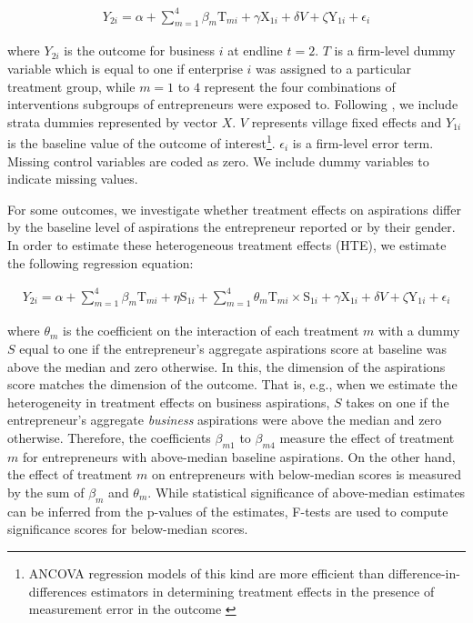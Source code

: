 \documentclass[11.5pt]{article}
\begin{document}
\begin{align}
    {Y}_{2i} = \alpha + \sum\limits_{m=1}^4 \beta_m \text{T}_{mi} + \gamma \text{X}_{1i} + \delta {V} + \zeta \text{Y}_{1i} + \epsilon_i \label{eq:1}
\end{align}

where ${Y}_{2i}$ is the outcome for business $i$ at endline $t=2$. $T$ is a firm-level dummy variable which is equal to one if enterprise $i$ was assigned to a particular treatment group, while $m = 1$ to $4$ represent the four combinations of interventions subgroups of entrepreneurs were exposed to. Following \citet{Bruhn2009}, we include strata dummies represented by vector $X$. $V$ represents village fixed effects and $Y_{1i}$ is the baseline value of the outcome of interest\footnote{ANCOVA regression models of this kind are more efficient than difference-in-differences estimators in determining treatment effects in the presence of measurement error in the outcome \citep{McKenzie2012}}. $\epsilon_i$ is a firm-level error term. Missing control variables are coded as zero. We include dummy variables to indicate missing values.

For some outcomes, we investigate whether treatment effects on aspirations differ by the baseline level of aspirations the entrepreneur reported or by their gender. In order to estimate these heterogeneous treatment effects (HTE), we estimate the following regression equation:

\begin{align}
    {Y}_{2i} = \alpha + \sum\limits_{m=1}^4 \beta_m \text{T}_{mi} + \eta \text{S}_{1i} + \sum\limits_{m=1}^4 \theta_m \text{T}_{mi} \times \text{S}_{1i} + \gamma \text{X}_{1i} + \delta {V} + \zeta \text{Y}_{1i} + \epsilon_i \label{eq:2}
\end{align}

where $\theta_m$ is the coefficient on the interaction of each treatment $m$ with a dummy $S$ equal to one if the entrepreneur's aggregate aspirations score at baseline was above the median and zero otherwise. In this, the dimension of the aspirations score matches the dimension of the outcome. That is, e.g., when we estimate the heterogeneity in treatment effects on business aspirations, $S$ takes on one if the entrepreneur's aggregate \emph{business} aspirations were above the median and zero otherwise. Therefore, the coefficients $\beta_{m1}$ to $\beta_{m4}$ measure the effect of treatment $m$ for entrepreneurs with above-median baseline aspirations. On the other hand, the effect of treatment $m$ on entrepreneurs with below-median scores is measured by the sum of $\beta_m$ and $\theta_m$. While statistical significance of above-median estimates can be inferred from the p-values of the estimates, F-tests are used to compute significance scores for below-median scores.
\end{document}

